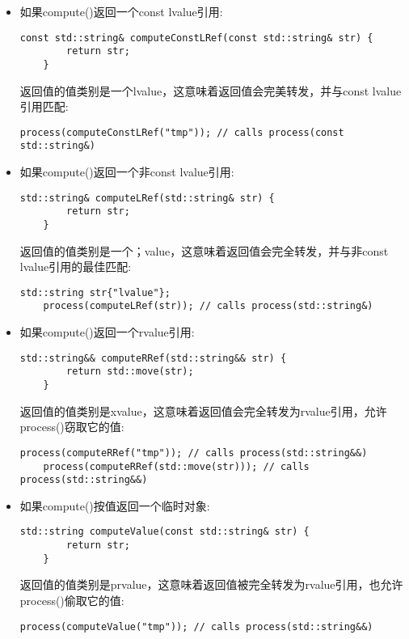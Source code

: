 \begin{itemize}
	\item 如果compute()返回一个const lvalue引用:\par
	\begin{lstlisting}[caption={}]
	const std::string& computeConstLRef(const std::string& str) {
		return str;
	}
	\end{lstlisting}
	返回值的值类别是一个lvalue，这意味着返回值会完美转发，并与const lvalue引用匹配:\par
	\begin{lstlisting}[caption={}]
	process(computeConstLRef("tmp")); // calls process(const std::string&)
	\end{lstlisting}
	\item 如果compute()返回一个非const lvalue引用:\par
	\begin{lstlisting}[caption={}]
	std::string& computeLRef(std::string& str) {
		return str;
	}
	\end{lstlisting}
	返回值的值类别是一个；value，这意味着返回值会完全转发，并与非const lvalue引用的最佳匹配:\par
	\begin{lstlisting}[caption={}]
	std::string str{"lvalue"};
	process(computeLRef(str)); // calls process(std::string&)
	\end{lstlisting}
	\item 如果compute()返回一个rvalue引用:\par
	\begin{lstlisting}[caption={}]
	std::string&& computeRRef(std::string&& str) {
		return std::move(str);
	}
	\end{lstlisting}
	返回值的值类别是xvalue，这意味着返回值会完全转发为rvalue引用，允许process()窃取它的值:\par
	\begin{lstlisting}[caption={}]
	process(computeRRef("tmp")); // calls process(std::string&&)
	process(computeRRef(std::move(str))); // calls process(std::string&&)
	\end{lstlisting}
	\item 如果compute()按值返回一个临时对象:\par
	\begin{lstlisting}[caption={}]
	std::string computeValue(const std::string& str) {
		return str;
	}
	\end{lstlisting}
	返回值的值类别是prvalue，这意味着返回值被完全转发为rvalue引用，也允许process()偷取它的值:\par
	\begin{lstlisting}[caption={}]
	process(computeValue("tmp")); // calls process(std::string&&)
	\end{lstlisting}
\end{itemize}

